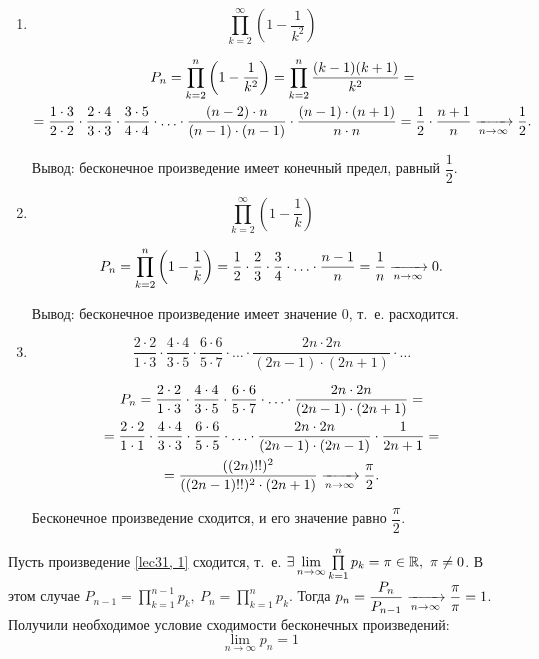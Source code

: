 \documentclass[../../main.tex]{subfiles}
\begin{document}
	\begin{examples}
		
		\;
		
		\begin{enumerate}[label=\arabic*)]
			\item \[ \prod\limits_{k = 2}^{\infty} \left(1 - \frac{1}{k^2}\right) \]
			
			\begin{gather*}
			P_n = \prod\limits_{k = 2}^{n} \left(1 - \frac{1}{k^2}\right) = 
			\prod\limits_{k = 2}^{n} \frac{(k - 1)(k + 1)}{k^2} = \\
			= \frac{1 \cdot 3}{2 \cdot 2} \cdot \frac{2 \cdot 4}{3 \cdot 3} \cdot 
			\frac{3 \cdot 5}{4 \cdot 4} \cdot \ldots \cdot \frac{(n - 2) \cdot n}{(n - 
			1) \cdot (n - 1)} \cdot \frac{(n - 1) \cdot (n + 1)}{n \cdot n} = 
			\frac{1}{2} \cdot \frac{n + 1}{n} \xrightarrow[n \to \infty]{} \frac{1}{2}.
			\end{gather*}
			
			Вывод: бесконечное произведение имеет конечный предел, равный 
			$\dfrac{1}{2}$.
			
			\item  \[ \prod\limits_{k = 2}^{\infty} \left(1 - \frac{1}{k}\right) \]
			
			\[P_n = \prod\limits_{k = 2}^{n} \left(1 - \frac{1}{k}\right) = \frac{1}{2} 
			\cdot \frac{2}{3} \cdot \frac{3}{4} \cdot \ldots \cdot \frac{n - 1}{n} = 
			\frac{1}{n} \xrightarrow[n \to \infty]{} 0.\]
			
			Вывод: бесконечное произведение имеет 
			значение $0$, т.~е. расходится.
			
			\item \[ \frac{2 \cdot 2}{1 \cdot 3} \cdot \frac{4 \cdot 4}{3 \cdot 5} 
			\cdot \frac{6 \cdot 6}{5 \cdot 7} \cdot \ldots \cdot \frac{2n \cdot 2n}{(2n 
			- 1) \cdot (2n + 1)} \cdot \ldots\]
			
			\begin{gather*}
			P_n =
			\frac{2 \cdot 2}{1 \cdot 3} \cdot \frac{4 \cdot 4}{3 
			\cdot 5} \cdot \frac{6 \cdot 6}{5 \cdot 7} \cdot \ldots \cdot \frac{2n 
			\cdot 2n}{(2n - 1) \cdot (2n + 1)} = \\
			= \frac{2 \cdot 2}{1 \cdot 1} \cdot \frac{4 \cdot 4}{3 \cdot 3} 
			\cdot \frac{6 \cdot 6}{5 \cdot 5} \cdot \ldots \cdot \frac{2n \cdot 2n}{(2n 
			- 1) \cdot (2n - 1)} \cdot \frac1{2n+1} = \\
			= \frac{((2n)!!)^2}{((2n - 1)!!)^2 \cdot (2n + 1)} \xrightarrow[n \to \infty]{} 
			\frac{\pi}{2}.
			\end{gather*}
			
			Бесконечное произведение сходится, и его значение равно $\dfrac{\pi}{2}$.
		\end{enumerate}
	\end{examples}
	Пусть произведение \eqref{lec31, 1} сходится, т.~е. $\exists \lim\limits_{n 
	\to \infty} 
	\prod\limits_{k = 1}^{n} p_k = \pi \in \mathbb{R},\ \pi \neq 0$. В этом случае $P_{n 
	- 1} = \prod\limits_{k = 1}^{n - 1}p_k,\ P_{n} = \prod\limits_{k = 
	1}^{n}p_k$. Тогда $p_n = \dfrac{P_n}{P_{n - 1}} \xrightarrow[n \to \infty]{} 
	\dfrac{\pi}{\pi} = 1$. Получили необходимое условие сходимости бесконечных 
	произведений:
	\[\boxed{\lim_{n\to\infty} p_n = 1}\]
		
\end{document}
